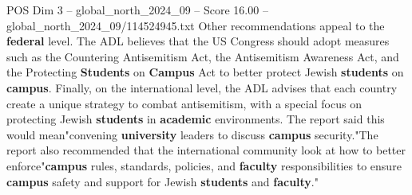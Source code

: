 \begin{textsample}{POS Dim 3 – global\_north\_2024\_09 – Score 16.00 – global\_north\_2024\_09/114524945.txt}
Other recommendations appeal to the \textbf{federal} level.
The ADL believes that the US Congress should adopt measures such as the Countering Antisemitism Act, the Antisemitism Awareness Act, and the Protecting \textbf{Students} on \textbf{Campus} Act to better protect Jewish \textbf{students} on \textbf{campus}.
Finally, on the international level, the ADL advises that each country create a unique strategy to combat antisemitism, with a special focus on protecting Jewish \textbf{students} in \textbf{academic} environments.
The report said this would mean"convening \textbf{university} leaders to discuss \textbf{campus} security."The report also recommended that the international community look at how to better enforce"\textbf{campus} rules, standards, policies, and \textbf{faculty} responsibilities to ensure \textbf{campus} safety and support for Jewish \textbf{students} and \textbf{faculty}."

\end{textsample}
